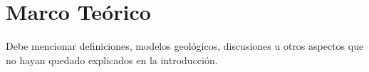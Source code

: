 \setcounter{figure}{0} %
\renewcommand{\thefigure}{\thesection.\arabic{figure}}
\chapter{Marco Teórico}
Debe mencionar definiciones, modelos geológicos, discusiones u otros aspectos que no hayan quedado explicados en la introducción.
